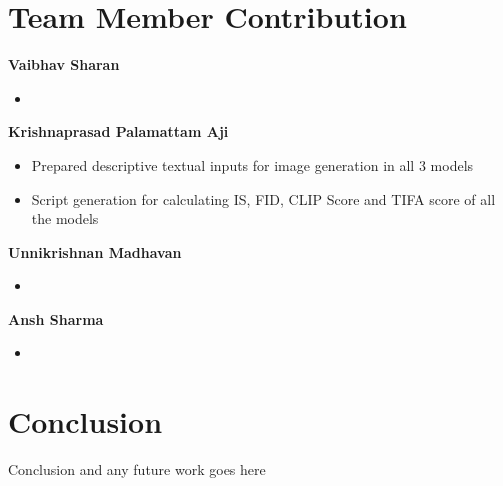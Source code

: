 \documentclass{article}
\begin{document}
\section{Team Member Contribution}
\textbf{Vaibhav Sharan}
\begin{itemize}
    \item 
\end{itemize}
\textbf{Krishnaprasad Palamattam Aji}
\begin{itemize}
    \item Prepared descriptive textual inputs for image generation in all 3 models
    \item Script generation for calculating IS, FID, CLIP Score and TIFA score of all the models
\end{itemize}
\textbf{Unnikrishnan Madhavan}
\begin{itemize}
    \item 
\end{itemize}
\textbf{Ansh Sharma}
\begin{itemize}
    \item 
\end{itemize}

\section{Conclusion}
Conclusion and any future work goes here


\pagebreak

  
  
\end{document}
